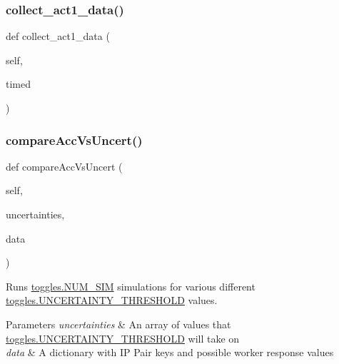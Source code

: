 \subsubsection{\texorpdfstring{collect\+\_\+act1\+\_\+data()}{collect\_act1\_data()}}
{\footnotesize\ttfamily def collect\+\_\+act1\+\_\+data (\begin{DoxyParamCaption}\item[{}]{self,  }\item[{}]{timed }\end{DoxyParamCaption})}

\mbox{\label{classdynamicfilterapp_1_1test__simulations_1_1_simulation_test_a1395b2cd07f422278160348baec14c9b}} 
\subsubsection{\texorpdfstring{compare\+Acc\+Vs\+Uncert()}{compareAccVsUncert()}}
{\footnotesize\ttfamily def compare\+Acc\+Vs\+Uncert (\begin{DoxyParamCaption}\item[{}]{self,  }\item[{}]{uncertainties,  }\item[{}]{data }\end{DoxyParamCaption})}



Runs \hyperlink{namespacedynamicfilterapp_1_1toggles_a3baf5565851cd87736238d8dddfc1106}{toggles.\+N\+U\+M\+\_\+\+S\+IM} simulations for various different \hyperlink{namespacedynamicfilterapp_1_1toggles_aaefdc27b85545eb4a910f5c65f7d8bbb}{toggles.\+U\+N\+C\+E\+R\+T\+A\+I\+N\+T\+Y\+\_\+\+T\+H\+R\+E\+S\+H\+O\+LD} values. 


\begin{DoxyParams}{Parameters}
{\em uncertainties} & An array of values that \hyperlink{namespacedynamicfilterapp_1_1toggles_aaefdc27b85545eb4a910f5c65f7d8bbb}{toggles.\+U\+N\+C\+E\+R\+T\+A\+I\+N\+T\+Y\+\_\+\+T\+H\+R\+E\+S\+H\+O\+LD} will take on \\
\hline
{\em data} & A dictionary with IP Pair keys and possible worker response values \\
\hline
\end{DoxyParams}
\mbox{\label{classdynamicfilterapp_1_1test__simulations_1_1_simulation_test_ace5df674cddd1b8f77748b585a69feb9}} 
